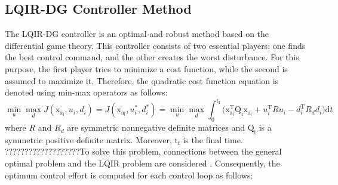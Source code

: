 \documentclass[3p,times]{elsarticle}
\begin{document}
\subsection{LQIR-DG Controller Method}
\noindent The LQIR-DG controller is an optimal and robust method based on the differential game theory. This controller consists of two essential players: one finds the best control command, and the other creates the worst disturbance. 
For this purpose, the first player tries to minimize a cost function, while the second is assumed to maximize it. Therefore, the quadratic cost function equation is denoted using min-max operators as follows:
\begin{equation}
    \min_{u} \max_{d} J(\boldsymbol{\mathrm{x_{a_i}}}, {u_i}, {d_i}) = J(\boldsymbol{\mathrm{x_{a_i}}}, {u^*_i}, {d^*_i})=\min_{u} \max_{d}
     \int_{0}^{\mathrm{t_f}}\biggl (\boldsymbol{\mathrm{x^\mathrm{T}_{a_i}}}  \boldsymbol{\mathrm{Q_i}} \boldsymbol{\mathrm{x_{a_i}}}+
    {{u^\mathrm{T}_i}}  {{R}} {{u_i}}-
    {{d^\mathrm{T}_{i}}} {{ R_{d} d_{i}}}
    \biggl )\mathrm{d}t
\end{equation}
where ${{ R}}$ and ${{R_{d}}}$ are symmetric nonnegative definite matrices and $\boldsymbol{\mathrm{Q_i}} $ is a symmetric positive definite matrix.  Moreover, $\mathrm{t_f}$ is the final time. ???????????????????To solve this problem, connections between the general optimal problem and the LQIR problem are considered \cite{LQDG}. Consequently, the optimum control effort is computed for each control loop as follows:
\end{document}
